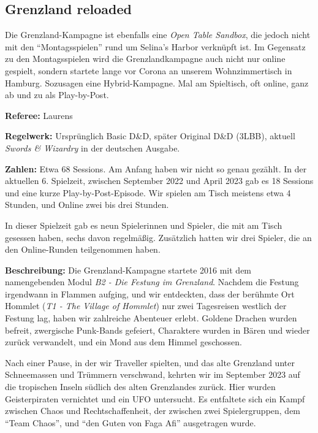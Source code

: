 \documentclass[11pt]{wbzine}
\begin{document}
\begin{multicols}{2}

\section{Grenzland reloaded}
\label{grenzland-reloaded}
Die Grenzland-Kampagne ist ebenfalls eine \textit{Open Table Sandbox},
die jedoch nicht mit den ``Montagsspielen'' rund um Selina's Harbor
verknüpft ist. Im Gegensatz zu den Montagsspielen wird die
Grenzlandkampagne auch nicht nur online gespielt, sondern startete
lange vor Corona an unserem Wohnzimmertisch in Hamburg. Sozusagen
eine Hybrid-Kampagne. Mal am Spieltisch, oft online, ganz ab und zu
als Play-by-Post.

\textbf{Referee:} Laurens

\textbf{Regelwerk:} Ursprünglich Basic D\&D, später Original D\&D
(3LBB),
aktuell \textit{Swords \& Wizardry} in der deutschen Ausgabe.

\textbf{Zahlen:} Etwa 68 Sessions. Am Anfang haben wir nicht so
genau gezählt. In der aktuellen 6. Spielzeit, zwischen September
2022 und April 2023 gab es 18 Sessions und eine kurze
Play-by-Post-Episode. Wir spielen am Tisch meistens etwa 4 Stunden,
und Online zwei bis drei Stunden.

In dieser Spielzeit gab es neun Spielerinnen und Spieler, die mit am
Tisch gesessen haben, sechs davon regelmäßig. Zusätzlich
hatten wir drei Spieler, die an den Online-Runden teilgenommen
haben.

\textbf{Beschreibung:} Die Grenzland-Kampagne startete 2016 mit dem
namengebenden Modul \textit{B2 - Die Festung im Grenzland}. Nachdem
die Festung irgendwann in Flammen aufging, und wir entdeckten, dass
der berühmte Ort Hommlet (\textit{T1 - The Village of Hommlet}) nur
zwei Tagesreisen westlich der Festung lag, haben wir zahlreiche
Abenteuer erlebt. Goldene Drachen wurden befreit, zwergische
Punk-Bands gefeiert, Charaktere wurden in Bären und wieder zurück
verwandelt, und ein Mond aus dem Himmel geschossen.

Nach einer Pause, in der wir Traveller spielten, und das alte
Grenzland unter Schneemassen und Trümmern verschwand, kehrten wir im
September 2023 auf die tropischen Inseln südlich des alten
Grenzlandes zurück. Hier wurden Geisterpiraten vernichtet und ein
UFO untersucht. Es entfaltete sich ein Kampf zwischen Chaos und
Rechtschaffenheit, der zwischen zwei Spielergruppen, dem ``Team
Chaos'', und ``den Guten von Faga Afi'' ausgetragen wurde. 


\end{multicols}
\end{document}
